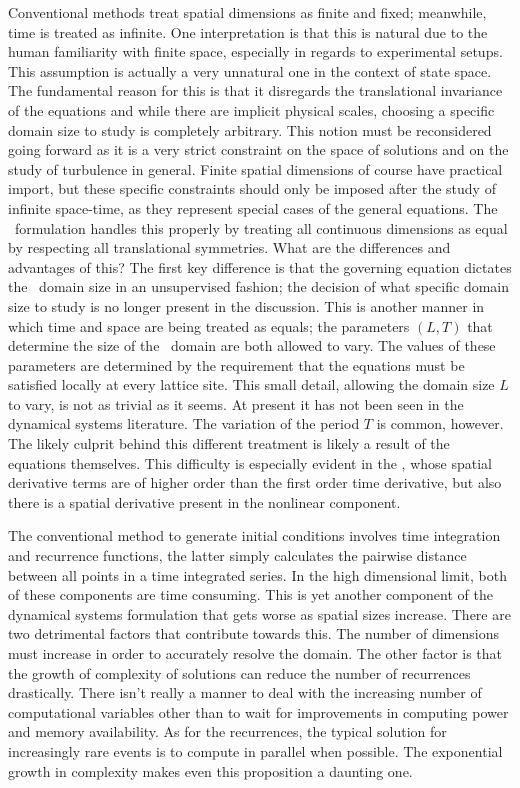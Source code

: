 Conventional methods treat spatial dimensions
as finite and fixed; meanwhile, time is treated as infinite.
One interpretation is that this is natural due to the
human familiarity with finite space, especially in regards
to experimental setups.
This assumption is actually a very unnatural one
in the context of state space. The fundamental reason
for this is that it disregards
the translational invariance of the equations and while there
are implicit physical scales, choosing a specific domain size
to study is completely arbitrary. This notion
must be reconsidered going forward as it is a very strict constraint
on the space of solutions and on the study of turbulence in general.
Finite spatial dimensions of course have practical import, but
these specific constraints should only be imposed after the
study of infinite space-time, as they represent special
cases of the general equations. The \spt\ formulation handles
this properly by treating all continuous dimensions as equal
by respecting all translational symmetries.
What are the differences and advantages of this?
The first key difference is that the governing equation
dictates the \spt\ domain size in an unsupervised
fashion; the decision of what specific domain size
to study is no longer present in the discussion.
This is another manner in which
time and space are being treated as equals; the parameters $(L,T)$
that determine the size of the \spt\ domain are both allowed to vary.
The values of these parameters
are determined by the requirement that the equations
must be satisfied locally at every lattice site.
This small detail, allowing the domain size $L$ to vary,
is not as trivial as it seems. At present it has not been seen in
the dynamical systems literature. The variation of the period $T$ is
common, however. The likely culprit behind this different treatment
is likely a result of the equations themselves. This difficulty
is especially evident in the \KSe, whose spatial derivative terms
are of higher order than the first order time derivative, but also
there is a spatial derivative present in the nonlinear component.


    The conventional method to generate initial conditions
involves time integration and recurrence functions, the latter simply
calculates the pairwise distance between all points in a time integrated
series.%
In the high dimensional limit, both
of these components are time consuming. This is yet another
component of the dynamical systems formulation that gets worse
as spatial sizes increase. There are two detrimental factors
that contribute towards this. The number of dimensions must increase
in order to accurately resolve the domain. The other factor is that
the growth of complexity of solutions can reduce the number of recurrences
drastically. There isn't really a manner to deal with the increasing
number of computational variables other than to wait for improvements
in computing power and memory availability. As for the recurrences, the
typical solution for increasingly rare events is to compute in parallel when
possible. The exponential growth in complexity makes even this proposition
a daunting one.

